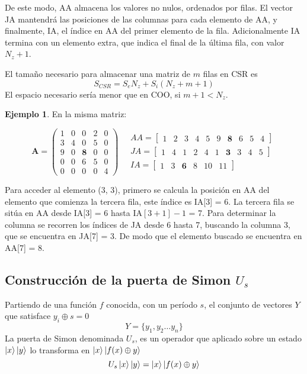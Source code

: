 \documentclass{article}
\newcommand*\mat[1]{ \begin{pmatrix} #1 \end{pmatrix}}
\newcommand*\arr[1]{ \begin{bmatrix} #1 \end{bmatrix}}
\theoremstyle{definition}
\newtheorem{ejemplo}{Ejemplo}[section]
\begin{document}
De este modo, AA almacena los valores no nulos, ordenados por filas. El vector 
JA mantendrá las posiciones de las columnas para cada elemento de AA, y 
finalmente, IA, el índice en AA del primer elemento de la fila. Adicionalmente 
IA termina con un elemento extra, que indica el final de la última fila, con 
valor $N_z + 1$.

El tamaño necesario para almacenar una matriz de $m$ filas en CSR es
$$ S_{CSR} = S_e N_z + S_i (N_z + m + 1) $$
El espacio necesario sería menor que en COO, si $m + 1 < N_z$.

\begin{ejemplo} En la misma matriz:

$$ \textbf{A} = \mat{
	1 & 0 & 0 & 2 & 0 \\
	3 & 4 & 0 & 5 & 0 \\
	9 & 0 & \textbf{8} & 0 & 0 \\
	0 & 0 & 6 & 5 & 0 \\
	0 & 0 & 0 & 0 & 4 }
\quad
\begin{aligned}
	AA = \arr{ 1 & 2 & 3 & 4 & 5  & 9 & \textbf{8} & 6 & 5 & 4} \\
	JA = \arr{ 1 & 4 & 1 & 2 & 4  & 1 & \textbf{3} & 3 & 4 & 5}\\
	IA = \arr{ 1 & 3 & \textbf{6} & 8 & 10 & 11}
\end{aligned}
$$

Para acceder al elemento (3, 3), primero se calcula la posición en AA del 
elemento que comienza la tercera fila, este índice es IA[3] = 6. La tercera fila 
se sitúa en AA desde IA[3] = 6 hasta IA$[3+1]-1$ = 7.  Para determinar la 
columna se recorren los índices de JA desde 6 hasta 7, buscando la columna 3, 
que se encuentra en JA[7] = 3. De modo que el elemento buscado se encuentra en 
AA[7] = 8.

\end{ejemplo}

\subsection{Construcción de la puerta de Simon $U_s$}

Partiendo de una función $f$ conocida, con un período $s$, el conjunto de 
vectores $Y$ que satisface $y_i \oplus s = 0$
$$Y = \{ y_1, y_2 \ldots y_n \}$$
La puerta de Simon denominada $U_s$, es un operador que aplicado sobre un estado 
$\ket{x}\ket{y}$ lo transforma en $\ket{x}\ket{f(x) \oplus y}$
\begin{equation}
\label{Us_def} U_s\ket{x} \ket{y} = \ket{x} \ket{f(x) \oplus y}
\end{equation}
%
%
%
\end{document}
